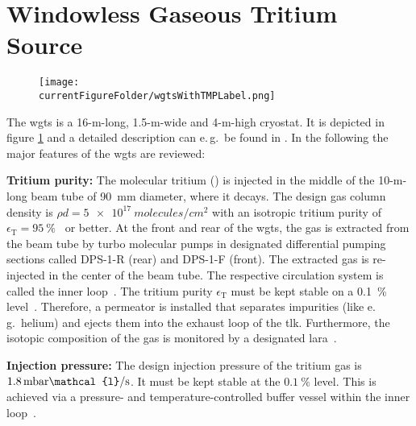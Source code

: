 \section{Windowless Gaseous Tritium Source}
\label{sec:katrinExpSetupWGTS}
\begin{figure}
    \centering    \texttt{[image: \\currentFigureFolder/wgtsWithTMPLabel.png]}
    \label{fig:katrinExpSetupWGTS}
\end{figure}%
The \gls{wgts} is a 16-m-long, 1.5-m-wide and 4-m-high cryostat. It is depicted in figure \ref{fig:katrinExpSetupWGTS} and a detailed description can e.\,g.~be found in \cite{Grohman2008,Babutzka2012}. In the following the major features of the \gls{wgts} are reviewed:

{\par\textbf{Tritium purity:} 
The molecular tritium () is injected in the middle of the 10-m-long beam tube of \SI{90}{mm} diameter, where it decays. The design gas column density is $\rho d = \SI{5e17}{molecules/{cm}^2}$ with an isotropic tritium purity of $\epsilon_\text{T} = \SI{95}{\percent}$~\cite{Angrik:2005ep} or better. At the front and rear of the \gls{wgts}, the gas is extracted from the beam tube by turbo molecular pumps in designated differential pumping sections called DPS-1-R (rear) and DPS-1-F (front). The extracted gas is re-injected in the center of the beam tube. The respective circulation system is called the inner loop~\cite{PRIESTER201542}. The tritium purity $\epsilon_\text{T}$ must be kept stable on a \SI{0.1}{\percent} level~\cite{Angrik:2005ep}. Therefore, a permeator is installed that separates impurities (like e.\,g.~helium) and ejects them into the exhaust loop of the \gls{tlk}. Furthermore, the isotopic composition of the gas
is monitored by a designated \gls{lara}~\cite{Schloesser2013}.}

{\par\textbf{Injection pressure:}
The design injection pressure of the tritium gas is $1.8\text{\,mbar}\mathcal{l}/\text{s}$. It must be kept stable at the $\SI{0.1}{\percent}$ level. This is achieved via a pressure- and temperature-controlled buffer vessel within the inner loop~\cite{PRIESTER201542}.}

